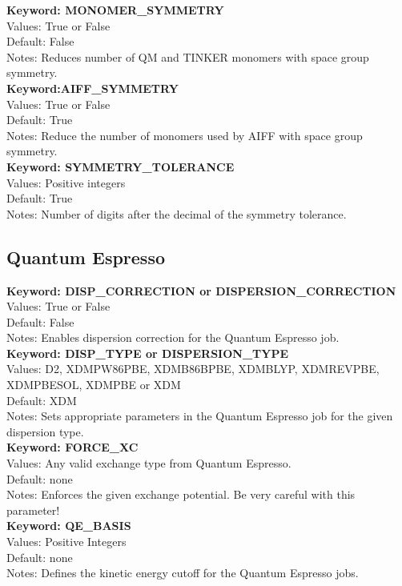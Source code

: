 \documentclass[11pt,letterpaper]{article}
\begin{document}
\begin{spacing}{1.0}
\noindent
\textbf{Keyword: MONOMER\_SYMMETRY}\\
Values: True or False\\
Default: False\\
Notes: Reduces number of QM and TINKER monomers with space group symmetry.\\

\noindent
\textbf{Keyword:AIFF\_SYMMETRY}\\
Values: True or False\\
Default: True\\
Notes: Reduce the number of monomers used by AIFF with space group symmetry.\\

\noindent
\textbf{Keyword: SYMMETRY\_TOLERANCE}\\
Values: Positive integers\\
Default: True\\
Notes: Number of digits after the decimal of the symmetry tolerance.\\


\subsection{Quantum Espresso}

\noindent
\textbf{Keyword: DISP\_CORRECTION or DISPERSION\_CORRECTION}\\
Values: True or False\\
Default: False\\
Notes: Enables dispersion correction for the Quantum Espresso job.\\

\noindent
\textbf{Keyword: DISP\_TYPE or DISPERSION\_TYPE}\\
Values: D2, XDM\-PW86PBE, XDM\-B86BPBE, XDM\-BLYP, XDM\-REVPBE, XDM\-PBESOL, XDM\-PBE or XDM\\
Default: XDM\\
Notes: Sets appropriate parameters in the Quantum Espresso job for the given dispersion type.\\

\noindent
\textbf{Keyword: FORCE\_XC}\\
Values: Any valid exchange type from Quantum Espresso.\\
Default: none\\
Notes: Enforces the given exchange potential. Be very careful with this parameter!\\

\noindent
\textbf{Keyword: QE\_BASIS}\\
Values: Positive Integers\\
Default: none\\
Notes: Defines the kinetic energy cutoff for the Quantum Espresso jobs.\\


\end{spacing}
\end{document}
